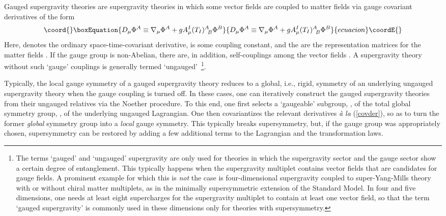\documentclass[a4paper,11pt]{article}
\begin{document}
Gauged supergravity theories
are  supergravity theories in which some vector fields \coordHE{}
are coupled to matter fields \coordHE{} via gauge
covariant derivatives of the form
\begin{equation}\coord{}\boxEquation{\label{covder}
D_{\mu}\Phi^A\equiv \nabla_\mu\Phi^A + g A_{\mu}^I
(T_I)^A_{\,\,\,B}\Phi^B
}{D_{\mu}\Phi^A\equiv \nabla_\mu\Phi^A + g A_{\mu}^I
(T_I)^A_{\,\,\,B}\Phi^B
}{ecuacion}\coordE{}\end{equation}
Here, \myHighlight{$\nabla_{\mu}$}\coordHE{} denotes the ordinary space-time-covariant derivative,
\coordHE{} is some coupling constant, and the \coordHE{} are the
representation matrices for the matter fields \coordHE{}. If the gauge group
is non-Abelian, there are, in addition, self-couplings among the vector
fields \coordHE{}.  A supergravity theory without such `gauge' couplings
is generally termed `ungauged'~\footnote{The terms `gauged' and `ungauged'
supergravity are only used for theories in which the supergravity sector
and the gauge sector show a certain degree of entanglement. This typically
happens when the supergravity multiplet contains vector fields that are
candidates for gauge fields. A prominent example for which this is
\emph{not} the case is four-dimensional \coordHE{} supergravity
coupled to \coordHE{} super-Yang-Mills theory with or without chiral
matter multiplets, as in the minimally supersymmetric extension of the
Standard Model. In four and five dimensions, one needs at least eight
supercharges for the supergravity multiplet to contain at least one vector
field, so that the term `gauged supergravity' is commonly used in these
dimensions only for theories with \coordHE{} supersymmetry.}. 


Typically, the local gauge symmetry of a gauged supergravity theory
reduces to a global, i.e., rigid, symmetry of an underlying ungauged
supergravity theory when the gauge coupling \coordHE{} is turned off. In these
cases, one can iteratively construct the gauged supergravity theories from
their ungauged relatives via the Noether procedure. To this end, one first
selects a `gaugeable' subgroup, \coordHE{}, of the total global symmetry group,
\coordHE{}, of the underlying ungauged Lagrangian. One then covariantizes the
relevant derivatives {\it \`{a} la} (\ref{covder}), so as to turn the
former \emph{global} symmetry group \coordHE{} into a \emph{local} gauge
symmetry. This typically breaks supersymmetry, but, if the gauge group \coordHE{}
was appropriately chosen, supersymmetry can be restored by adding a few
additional terms to the Lagrangian and the transformation laws. 
\end{document}
